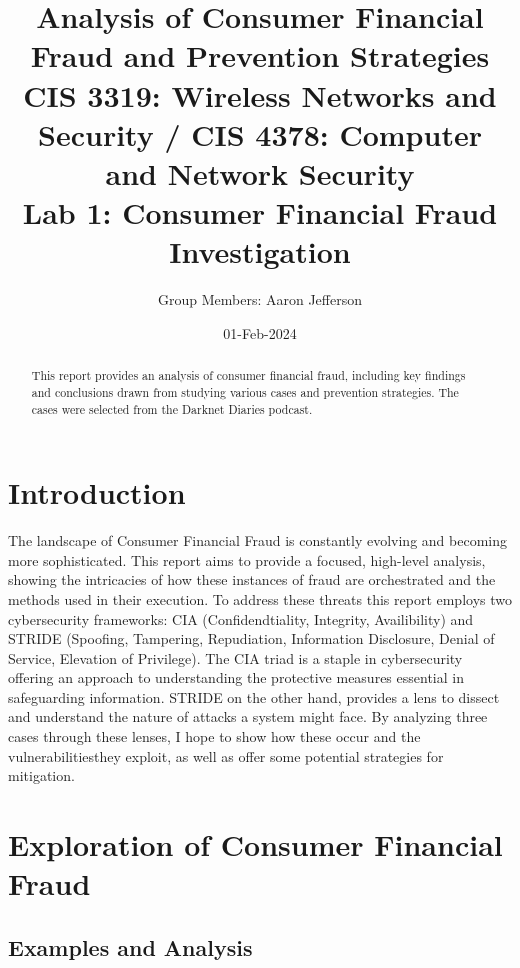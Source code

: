 \documentclass[11pt]{article}
\title{Analysis of Consumer Financial Fraud and Prevention Strategies \\
\large CIS 3319: Wireless Networks and Security / CIS 4378: Computer and Network Security \\
\large Lab 1: Consumer Financial Fraud Investigation}
\author{Group Members: Aaron Jefferson \\ }
\date{01-Feb-2024}
\begin{document}
\maketitle

\begin{abstract}
\noindent This report provides an analysis of consumer financial fraud, including key findings and conclusions drawn from studying various cases and prevention strategies. The cases were selected from the Darknet Diaries podcast. 
\end{abstract}

\tableofcontents

\section{Introduction}
The landscape of Consumer Financial Fraud is constantly evolving and becoming more sophisticated. This report aims to provide a focused, high-level analysis, showing the intricacies of how these instances of fraud are orchestrated and the methods used in their execution.
To address these threats this report employs two cybersecurity frameworks: CIA (Confidendtiality, Integrity, Availibility) and STRIDE (Spoofing, Tampering, Repudiation, Information Disclosure, Denial of Service, Elevation of Privilege). The CIA triad is a staple in cybersecurity offering an approach to understanding the protective measures essential in safeguarding information. STRIDE on the other hand, provides a lens to dissect and understand the nature of attacks a system might face. By analyzing three cases through these lenses, I hope to show how these occur and the vulnerabilitiesthey exploit, as well as offer some potential strategies for mitigation.
\section{Exploration of Consumer Financial Fraud}
\subsection{Examples and Analysis}
\end{document}
